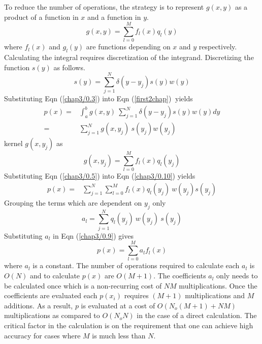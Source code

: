 To reduce the number of operations, the strategy is to 
represent $g(x,y)$ as a product of a function in  $x$ and a function
in  $y$. 
\begin{equation}
\label{chap3/0.1}
g(x,y)= \sum_{l=0}^{M} f_l(x)q_l(y)
\end{equation} 
 where $f_l(x)$ and $g_l(y)$ are functions depending on $x$ and $y$ respectively. 
Calculating  the integral requires discretization of the integrand. Discretizing    the  function $s(y)$ as follows.
\begin{equation}
\label{chap3/0.3}
s(y) = \sum_{j=1}^{N} \delta(y- y_j)s(y)w(y)
\end{equation} 
Substituting Eqn (\ref{chap3/0.3})  into Eqn (\ref{first2chap})$~$ yields
\begin{equation}
\label{chap3/0.10}
\begin{split}
p(x)= &\int_{a}^{b} g(x,y)~\sum_{j=1}^{N} \delta(y-y_j)s(y)w(y)dy \\
= & \sum_{j=1}^{N} g(x,y_j)~  s(y_j)w(y_j)
\end{split}
\end{equation} 
kernel $g(x,y_j)$ as
\begin{equation}
\label{chap3/0.5}
g(x,y_j)= \sum_{l=0}^{M} f_l(x)q_l(y_j)
\end{equation} 
Substituting Eqn (\ref{chap3/0.5}) into Eqn (\ref{chap3/0.10}) yields
\begin{equation}
\label{chap3/0.9}
\begin{split}
p(x)= &\sum_{j=1}^{N}\sum_{l=0}^{M} f_l(x)q_l(y_j) ~  w(y_j) s(y_j)
\end{split}
\end{equation} 
Grouping the terms which are dependent on $y_j$ only
\begin{equation}
\label{chap3/0.11}
a_{l}= \sum_{j=1}^{N}q_l(y_j)~  w(y_j)~ s(y_j)
\end{equation} 
 Substituting $a_{l}$ in Eqn (\ref{chap3/0.9}) gives
\begin{equation}
\label{chap3/0.13}
p(x)=  \sum_{l=0}^{M} a_{l}f_{l}(x)
\end{equation} 
where $a_l$ is a constant.  
The number of operations required to calculate each 
$a_l$ is $O(N)$ and to calculate $p(x)$ are $O(M+1)$. 
The coefficients $a_{l}$ only needs to be calculated  once which is a non-recurring cost of $NM$ multiplications.
Once the coefficients are evaluated
each $p(x_i)$ requires $(M+1)$ multiplications and $M$ additions.
As a result, $p$ is evaluated at a cost of 
$O(N_o (M+1) + N M)$ multiplications  as compared to
$O(N_o N)$ in the case of a direct calculation.
The critical factor in the calculation is on the
requirement that one can achieve high accuracy  for 
cases where $M$ is much less than $N$.

